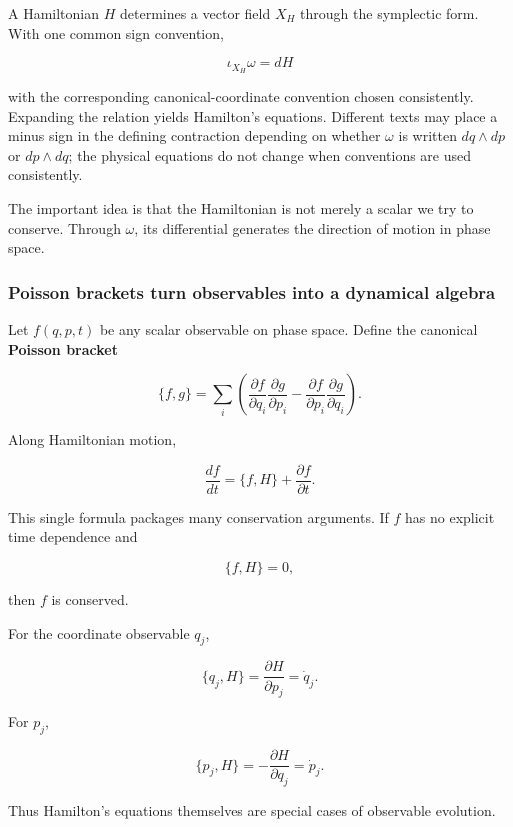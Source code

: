 A Hamiltonian \(H\) determines a vector field \(X_H\) through the symplectic form. With one common sign convention,

\[
\boxed{
\iota_{X_H}\omega=dH
}
\]

with the corresponding canonical-coordinate convention chosen consistently. Expanding the relation yields Hamilton's equations. Different texts may place a minus sign in the defining contraction depending on whether \(\omega\) is written \(dq\wedge dp\) or \(dp\wedge dq\); the physical equations do not change when conventions are used consistently.

The important idea is that the Hamiltonian is not merely a scalar we try to conserve. Through \(\omega\), its differential generates the direction of motion in phase space.

\subsubsection{Poisson brackets turn observables into a dynamical algebra}\label{02-foundations-ii-ch025-poisson-brackets-turn-observables-into-a-dynamical-algebra}

\hypertarget{02-foundations-ii-ch025-poisson-brackets-turn-observables-into-a-dynamical-algebra}{}

Let \(f(q,p,t)\) be any scalar observable on phase space. Define the canonical \textbf{Poisson bracket}

\[
\boxed{
\{f,g\}
=
\sum_i
\left(
\frac{\partial f}{\partial q_i}
\frac{\partial g}{\partial p_i}
-
\frac{\partial f}{\partial p_i}
\frac{\partial g}{\partial q_i}
\right)
}.
\]

Along Hamiltonian motion,

\[
\boxed{
\frac{df}{dt}
=
\{f,H\}
+
\frac{\partial f}{\partial t}
}.
\]

This single formula packages many conservation arguments. If \(f\) has no explicit time dependence and

\[
\{f,H\}=0,
\]

then \(f\) is conserved.

For the coordinate observable \(q_j\),

\[
\{q_j,H\}
=
\frac{\partial H}{\partial p_j}
=
\dot q_j.
\]

For \(p_j\),

\[
\{p_j,H\}
=
-
\frac{\partial H}{\partial q_j}
=
\dot p_j.
\]

Thus Hamilton's equations themselves are special cases of observable evolution.

